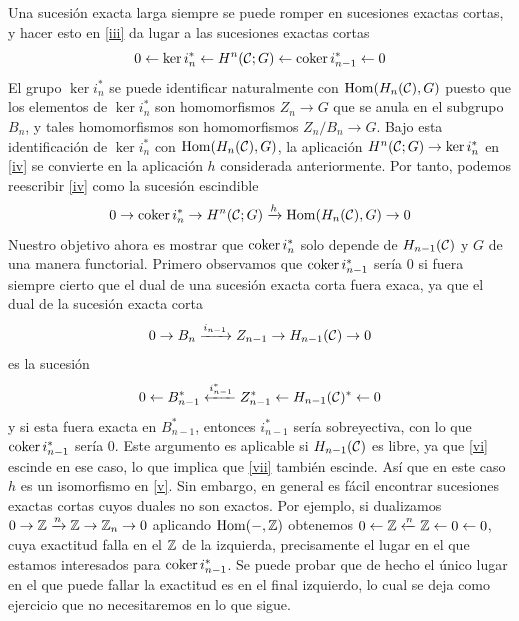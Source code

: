 \documentclass[TA.tex]{subfiles}
\begin{document}
Una sucesión exacta larga siempre se puede romper en sucesiones exactas cortas, y hacer esto en \ref{iii} da lugar a las sucesiones exactas cortas
\begin{equation}\label{iv}
0\leftarrow \ker i_n^*\leftarrow H^n(\mathcal{C};G)\leftarrow\operatorname{coker} i_{n-1}^*\leftarrow 0
\end{equation}
El grupo $\ker i_n^*$ se puede identificar naturalmente con $\operatorname{Hom}(H_n(\mathcal{C}),G)$ puesto que los elementos de $\ker i_n^*$ son homomorfismos $Z_n\to G$ que se anula en el subgrupo $B_n$, y tales homomorfismos son homomorfismos $Z_n/B_n\to G$. Bajo esta identificación de $\ker i_n^*$ con $\operatorname{Hom}(H_n(\mathcal{C}),G)$, la aplicación $H^n(\mathcal{C};G)\to\ker i_n^*$ en \ref{iv} se convierte en la aplicación $h$ considerada anteriormente. Por tanto, podemos reescribir \ref{iv} como la sucesión escindible
\begin{equation}\label{v}
0\to\operatorname{coker} i_n^*\to H^n(\mathcal{C};G)\xrightarrow{h}\operatorname{Hom}(H_n(\mathcal{C}),G)\to 0
\end{equation}
Nuestro objetivo ahora es mostrar que $\operatorname{coker} i_n^*$ solo depende de $H_{n-1}(\mathcal{C})$ y $G$ de una manera functorial.  Primero observamos que $\operatorname{coker} i_{n-1}^*$ sería 0 si fuera siempre cierto que el dual de una sucesión exacta corta fuera exaca, ya que el dual de la sucesión exacta corta 
\begin{equation}\label{vi}
0\to B_n\xrightarrow{i_{n-1}}Z_{n-1}\to H_{n-1}(\mathcal{C})\to 0
\end{equation} 
es la sucesión
\begin{equation}\label{vii}
0\leftarrow B_{n-1}^*\xleftarrow{i_{n-1}^*}Z_{n-1}^*\leftarrow H_{n-1}(\mathcal{C})^*\leftarrow 0
\end{equation}
y si esta fuera exacta en $B_{n-1}^*$, entonces $i_{n-1}^*$ sería sobreyectiva, con lo que $\operatorname{coker} i_{n-1}^*$ sería 0. Este argumento es aplicable si $H_{n-1}(\mathcal{C})$ es libre, ya que \ref{vi} escinde en ese caso, lo que implica que \ref{vii} también escinde. Así que en este caso $h$ es un isomorfismo en \ref{v}. Sin embargo, en general es fácil encontrar sucesiones exactas cortas cuyos duales no son exactos. Por ejemplo, si dualizamos $0\to\mathbb{Z}\xrightarrow{n}\mathbb{Z}\to\mathbb{Z}_n\to 0$ aplicando $\operatorname{Hom}(-,\mathbb{Z})$ obtenemos $0\leftarrow\mathbb{Z}\xleftarrow{n}\mathbb{Z}\leftarrow 0\leftarrow 0$, cuya exactitud falla en el $\mathbb{Z}$ de la izquierda, precisamente el lugar en el que estamos interesados para $\operatorname{coker} i_{n-1}^*$. Se puede probar que de hecho el único lugar en el que puede fallar la exactitud es en el final izquierdo, lo cual se deja como ejercicio que no necesitaremos en lo que sigue.
\end{document}
